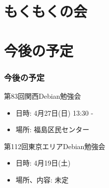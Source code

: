 \documentclass[cjk,dvipdfmx,10pt,compress,%
hyperref={bookmarks=true,bookmarksnumbered=true,bookmarksopen=false,%
colorlinks=false,%
pdftitle={第 82 回 関西 Debian 勉強会},%
pdfauthor={倉敷・のがた・佐々木・かわだ・八津尾},%
pdfsubject={資料},%
}]{beamer}
\begin{document}
\section{もくもくの会}


\section{今後の予定}
\begin{frame}[fragile]
\frametitle{今後の予定}

\begin{block}{第83回関西Debian勉強会}
  \begin{itemize}
  \item 日時: 4月27日(日) 13:30 -
  \item 場所: 福島区民センター
  \end{itemize}
\end{block}

\begin{block}{第112回東京エリアDebian勉強会}
  \begin{itemize}
  \item 日時: 4月19日(土)
  \item 場所、内容: 未定
  \end{itemize}
\end{block}

\end{frame}

\takahashi[50]{  }
\end{document}
